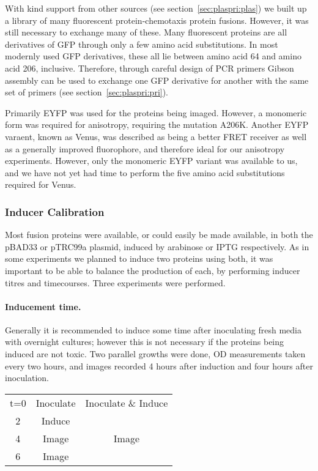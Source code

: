 \documentclass[../main.tex]{subfiles}
\begin{document}
With kind support from other sources (see section~\ref{sec:plaspri:plas}) we built up a library of many fluorescent protein-chemotaxis protein fusions. However, it was still necessary to exchange many of these. Many fluorescent proteins are all derivatives of GFP through only a few amino acid substitutions\cite{tsien98}. In most modernly used GFP derivatives, these all lie between amino acid 64 and amino acid 206, inclusive. Therefore, through careful design of PCR primers Gibson assembly can be used to exchange one GFP derivative for another with the same set of primers (see section~\ref{sec:plaspri:pri}).

Primarily EYFP was used for the proteins being imaged. However, a monomeric form was required for anisotropy\cite{vaknin07}, requiring the mutation A206K. Another EYFP varaent, known as Venus, was described as being a better FRET receiver\cite{nagai02} as well as a generally improved fluorophore, and therefore ideal for our anisotropy experiments. However, only the monomeric EYFP variant was available to us, and we have not yet had time to perform the five amino acid substitutions required for Venus.

\subsubsection{Inducer Calibration}

Most fusion proteins were available, or could easily be made available, in both the pBAD33 or pTRC99a plasmid, induced by arabinose or IPTG respectively. As in some experiments we planned to induce two proteins using both, it was important to be able to balance the production of each, by performing inducer titres and timecourses. Three experiments were performed.

\paragraph{Inducement time.} Generally it is recommended to induce some time after inoculating fresh media with overnight cultures; however this is not necessary if the proteins being induced are not toxic. Two parallel growths were done, OD measurements taken every two hours, and images recorded 4 hours after induction and four hours after inoculation.
\begin{center}
\begin{tabular}{ccc}
t=0	&	Inoculate	&	Inoculate \& Induce\\
2	&	Induce	&\\
4	&	Image	&	Image\\
6	&	Image	&
\end{tabular}
\end{center}
\end{document}
